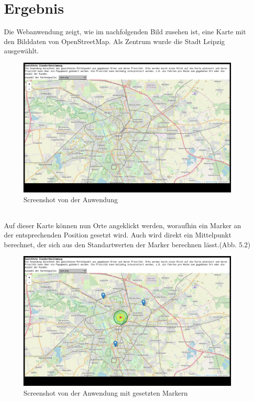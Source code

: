 \documentclass[a4paper, 12pt]{scrreprt}
\begin{document}
\chapter{Ergebnis}
Die Webanwendung zeigt, wie im nachfolgenden Bild zusehen ist, eine Karte mit den Bilddaten von OpenStreetMap. Als Zentrum wurde die Stadt Leipzig ausgewählt.\\
\begin{figure}[h]
\includegraphics[width=\linewidth]{bell1_1.png}
\caption{Screenshot von der Anwendung}
\end{figure}\\
Auf dieser Karte können nun Orte angeklickt werden, woraufhin ein Marker an der entsprechenden Position gesetzt wird. Auch wird direkt ein Mittelpunkt berechnet, der sich aus den Standartwerten der Marker berechnen lässt.(Abb. 5.2)\\
\begin{figure}[h]
\includegraphics[width=\linewidth]{bell2_1.png}
\caption{Screenshot von der Anwendung mit gesetzten Markern}
\end{figure}
\end{document}
